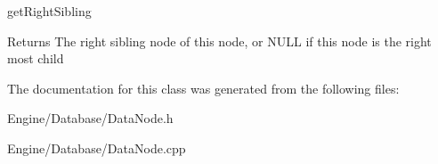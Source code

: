 get\+Right\+Sibling 

\begin{DoxyReturn}{Returns}
The right sibling node of this node, or N\+U\+LL if this node is the right most child 
\end{DoxyReturn}


The documentation for this class was generated from the following files\+:\begin{DoxyCompactItemize}
\item 
Engine/\+Database/Data\+Node.\+h\item 
Engine/\+Database/Data\+Node.\+cpp\end{DoxyCompactItemize}
